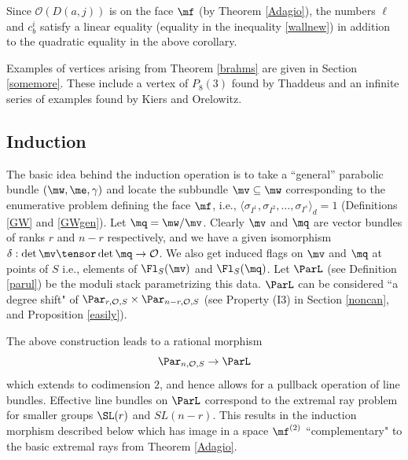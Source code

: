 \begin{remark}
\notready\label{brahms2}
Since $\mathcal{O}(D(a,j))$ is on the face $\mf$ (by Theorem \ref{Adagio}), the numbers $\ell$ and $c^i_b$ satisfy a linear equality (equality in the inequality \eqref{wallnew}) in addition to the quadratic equality in the above corollary.
\end{remark}
Examples of vertices arising from Theorem \ref{brahms} are given in Section \ref{somemore}. These include a vertex of $P_8(3)$ found by Thaddeus \cite{thaddy} and an infinite series of examples found by Kiers and Orelowitz.




\subsection{Induction}\label{schumann}
The basic idea behind the induction operation is to take a  ``general'' parabolic bundle $(\mw,\me,\gamma)$ and locate the subbundle $\mv\subseteq \mw$ corresponding to the enumerative problem  defining the face $\mf$, i.e., $\langle\sigma_{I^1}, \sigma_{I^2},\dots,\sigma_{I^s}\rangle_d= 1$ (Definitions \ref{GW}  and \ref{GWgen}). Let $\mq=\mw/\mv$. Clearly  $\mv$ and $\mq$ are vector bundles of ranks $r$ and $n-r$ respectively, and we have a given isomorphism $\delta:\det\mv \tensor\det\mq\to \mathcal{O}$. We also get induced flags on $\mv$ and $\mq$ at points of $S$ i.e., elements of  $ \Fl_S(\mv)$ and $\Fl_S(\mq)$.  Let $\ParL$ (see Definition \ref{parul}) be the moduli stack parametrizing this data.  $\ParL$ can be considered ``a  degree shift"  of  $\Par_{r,\mathcal{O},S}\times\Par_{n-r,\mathcal{O},S}$ (see Property (I3) in Section \ref{noncan}, and Proposition \ref{easily}).

The above construction leads to a rational morphism
$$\Par_{n,\mathcal{O},S}\to \ParL$$
which  extends to codimension $2$, and hence allows for a pullback operation of line bundles.
Effective line bundles on $\ParL$ correspond to  the extremal  ray problem for smaller groups $\SL(r)$ and $SL(n-r)$. This results in the induction morphism described below which has image in a space $\mf^{(2)}$ ``complementary" to the basic extremal rays from Theorem \ref{Adagio}.


